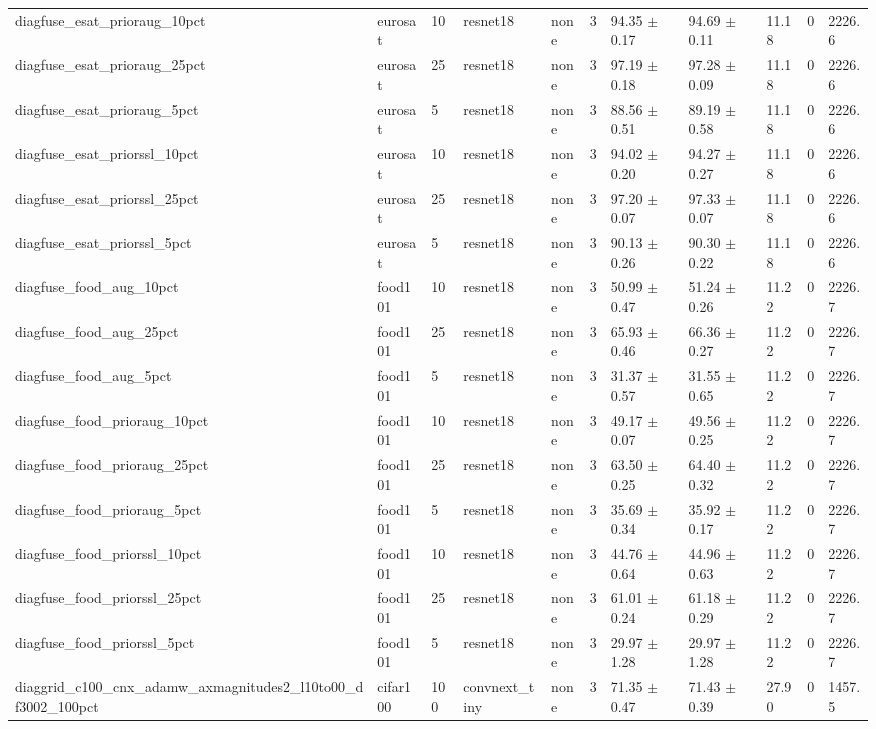 \begin{tabular}{lllllllllll}
diagfuse_esat_prioraug_10pct & eurosat & 10 & resnet18 & none & 3 & 94.35 $\pm$ 0.17 & 94.69 $\pm$ 0.11 & 11.18 & 0 & 2226.6 \\
diagfuse_esat_prioraug_25pct & eurosat & 25 & resnet18 & none & 3 & 97.19 $\pm$ 0.18 & 97.28 $\pm$ 0.09 & 11.18 & 0 & 2226.6 \\
diagfuse_esat_prioraug_5pct & eurosat & 5 & resnet18 & none & 3 & 88.56 $\pm$ 0.51 & 89.19 $\pm$ 0.58 & 11.18 & 0 & 2226.6 \\
diagfuse_esat_priorssl_10pct & eurosat & 10 & resnet18 & none & 3 & 94.02 $\pm$ 0.20 & 94.27 $\pm$ 0.27 & 11.18 & 0 & 2226.6 \\
diagfuse_esat_priorssl_25pct & eurosat & 25 & resnet18 & none & 3 & 97.20 $\pm$ 0.07 & 97.33 $\pm$ 0.07 & 11.18 & 0 & 2226.6 \\
diagfuse_esat_priorssl_5pct & eurosat & 5 & resnet18 & none & 3 & 90.13 $\pm$ 0.26 & 90.30 $\pm$ 0.22 & 11.18 & 0 & 2226.6 \\
diagfuse_food_aug_10pct & food101 & 10 & resnet18 & none & 3 & 50.99 $\pm$ 0.47 & 51.24 $\pm$ 0.26 & 11.22 & 0 & 2226.7 \\
diagfuse_food_aug_25pct & food101 & 25 & resnet18 & none & 3 & 65.93 $\pm$ 0.46 & 66.36 $\pm$ 0.27 & 11.22 & 0 & 2226.7 \\
diagfuse_food_aug_5pct & food101 & 5 & resnet18 & none & 3 & 31.37 $\pm$ 0.57 & 31.55 $\pm$ 0.65 & 11.22 & 0 & 2226.7 \\
diagfuse_food_prioraug_10pct & food101 & 10 & resnet18 & none & 3 & 49.17 $\pm$ 0.07 & 49.56 $\pm$ 0.25 & 11.22 & 0 & 2226.7 \\
diagfuse_food_prioraug_25pct & food101 & 25 & resnet18 & none & 3 & 63.50 $\pm$ 0.25 & 64.40 $\pm$ 0.32 & 11.22 & 0 & 2226.7 \\
diagfuse_food_prioraug_5pct & food101 & 5 & resnet18 & none & 3 & 35.69 $\pm$ 0.34 & 35.92 $\pm$ 0.17 & 11.22 & 0 & 2226.7 \\
diagfuse_food_priorssl_10pct & food101 & 10 & resnet18 & none & 3 & 44.76 $\pm$ 0.64 & 44.96 $\pm$ 0.63 & 11.22 & 0 & 2226.7 \\
diagfuse_food_priorssl_25pct & food101 & 25 & resnet18 & none & 3 & 61.01 $\pm$ 0.24 & 61.18 $\pm$ 0.29 & 11.22 & 0 & 2226.7 \\
diagfuse_food_priorssl_5pct & food101 & 5 & resnet18 & none & 3 & 29.97 $\pm$ 1.28 & 29.97 $\pm$ 1.28 & 11.22 & 0 & 2226.7 \\
diaggrid_c100_cnx_adamw_axmagnitudes2_l10to00_df3002_100pct & cifar100 & 100 & convnext_tiny & none & 3 & 71.35 $\pm$ 0.47 & 71.43 $\pm$ 0.39 & 27.90 & 0 & 1457.5 \\

\end{tabular}
